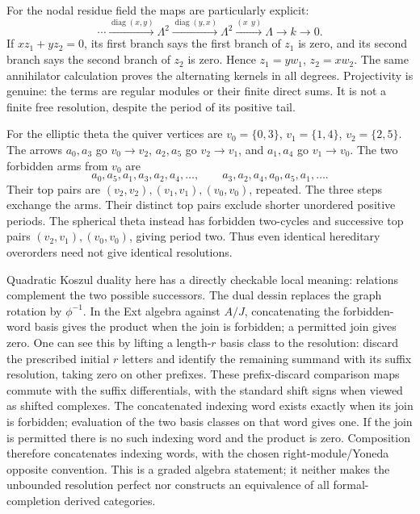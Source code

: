 \documentclass[11pt]{article}
\theoremstyle{definition}\newtheorem{definition}[theorem]{Definition}
\theoremstyle{remark}\newtheorem{remark}[theorem]{Remark}
\begin{document}
For the nodal residue field the maps are particularly explicit:
\[
 \cdots\xrightarrow{\operatorname{diag}(x,y)}\Lambda^2
 \xrightarrow{\operatorname{diag}(y,x)}\Lambda^2
 \xrightarrow{(x\ \ y)}\Lambda\longrightarrow k\longrightarrow0.
\]
If $xz_1+yz_2=0$, its first branch says the first branch of $z_1$ is zero, and its second branch says the second branch of $z_2$ is zero. Hence $z_1=yw_1$, $z_2=xw_2$. The same annihilator calculation proves the alternating kernels in all degrees. Projectivity is genuine: the terms are regular modules or their finite direct sums. It is not a finite free resolution, despite the period of its positive tail.

For the elliptic theta the quiver vertices are $v_0=\{0,3\}$, $v_1=\{1,4\}$, $v_2=\{2,5\}$. The arrows $a_0,a_3$ go $v_0\to v_2$, $a_2,a_5$ go $v_2\to v_1$, and $a_1,a_4$ go $v_1\to v_0$. The two forbidden arms from $v_0$ are
\[
 a_0,a_5,a_1,a_3,a_2,a_4,\ldots,\qquad
 a_3,a_2,a_4,a_0,a_5,a_1,\ldots.
\]
Their top pairs are $(v_2,v_2),(v_1,v_1),(v_0,v_0)$, repeated. The three steps exchange the arms. Their distinct top pairs exclude shorter unordered positive periods. The spherical theta instead has forbidden two-cycles and successive top pairs $(v_2,v_1),(v_0,v_0)$, giving period two. Thus even identical hereditary overorders need not give identical resolutions.

Quadratic Koszul duality here has a directly checkable local meaning: relations complement the two possible successors. The dual dessin replaces the graph rotation by $\phi^{-1}$. In the Ext algebra against $A/J$, concatenating the forbidden-word basis gives the product when the join is forbidden; a permitted join gives zero. One can see this by lifting a length-$r$ basis class to the resolution: discard the prescribed initial $r$ letters and identify the remaining summand with its suffix resolution, taking zero on other prefixes. These prefix-discard comparison maps commute with the suffix differentials, with the standard shift signs when viewed as shifted complexes. The concatenated indexing word exists exactly when its join is forbidden; evaluation of the two basis classes on that word gives one. If the join is permitted there is no such indexing word and the product is zero. Composition therefore concatenates indexing words, with the chosen right-module/Yoneda opposite convention. This is a graded algebra statement; it neither makes the unbounded resolution perfect nor constructs an equivalence of all formal-completion derived categories.
\end{document}
